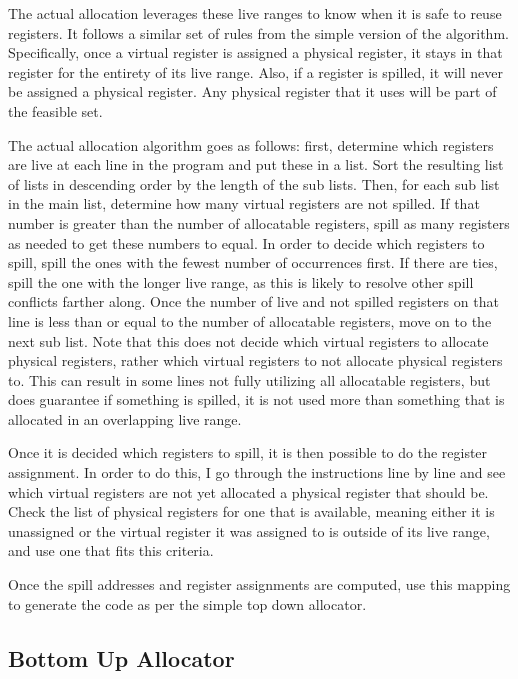 \documentclass[12pt]{article}
\begin{document}
    The actual allocation leverages these live ranges to know when it is safe to
    reuse registers. It follows a similar set of rules from the simple version
    of the algorithm. Specifically, once a virtual register is assigned a
    physical register, it stays in that register for the entirety of its live
    range. Also, if a register is spilled, it will never be assigned a physical
    register. Any physical register that it uses will be part of the feasible
    set.

    The actual allocation algorithm goes as follows: first, determine which
    registers are live at each line in the program and put these in a list. Sort
    the resulting list of lists in descending order by the length of the sub
    lists. Then, for each sub list in the main list, determine how many virtual
    registers are not spilled. If that number is greater than the number of
    allocatable registers, spill as many registers as needed to get these
    numbers to equal. In order to decide which registers to spill, spill the
    ones with the fewest number of occurrences first. If there are ties, spill
    the one with the longer live range, as this is likely to resolve other spill
    conflicts farther along. Once the number of live and not spilled registers
    on that line is less than or equal to the number of allocatable registers,
    move on to the next sub list. Note that this does not decide which virtual
    registers to allocate physical registers, rather which virtual registers to
    not allocate physical registers to. This can result in some lines not fully
    utilizing all allocatable registers, but does guarantee if something is
    spilled, it is not used more than something that is allocated in an
    overlapping live range.

    Once it is decided which registers to spill, it is then possible to do the
    register assignment. In order to do this, I go through the instructions line
    by line and see which virtual registers are not yet allocated a physical
    register that should be. Check the list of physical registers for one that
    is available, meaning either it is unassigned or the virtual register it was
    assigned to is outside of its live range, and use one that fits this
    criteria.

    Once the spill addresses and register assignments are computed, use this
    mapping to generate the code as per the simple top down allocator.


    \subsection{Bottom Up Allocator}
\end{document}
